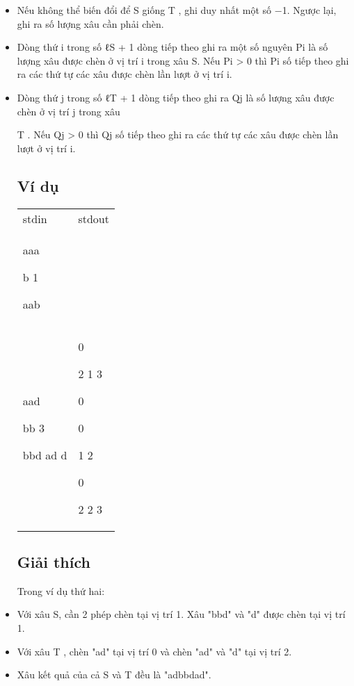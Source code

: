 \begin{itemize}
  \hfill\break
\item
  Nếu không thể biến đổi để {S }giống {T }, ghi duy nhất một số {−}{1}.
  Ngược lại, ghi ra số lượng xâu cần phải chèn.
\item
  {Dòng thứ }i {trong số }ℓ{S} {+ 1 }{dòng tiếp theo ghi ra một số
  nguyên }P{i} {là số lượng xâu được chèn ở vị trí }i {trong xâu }S{.
  Nếu }P{i} > {0 }{thì }P{i} {số tiếp theo ghi ra các thứ
  tự các xâu được chèn lần lượt ở vị trí }i{.}
\item
  {Dòng thứ }j {trong số }ℓ{T} {+ 1 }{dòng tiếp theo ghi ra }Q{j} {là số
  lượng xâu được chèn ở vị trí }j {trong xâu}

  T {. Nếu }Q{j} > {0 }{thì }Q{j} {số tiếp theo ghi ra các
  thứ tự các xâu được chèn lần lượt ở vị trí }i{.}

  \subsection{Ví dụ}\label{vuxed-dux1ee5}

  \hfill\break

  \begin{longtable}[]{@{}
    >{\raggedright\arraybackslash}p{}
    >{\raggedright\arraybackslash}p{}@{}}
  \toprule\noalign{}
  \endhead
  \bottomrule\noalign{}
  \endlastfoot
  stdin & stdout \\
  aaa

  b 1

  aab & -1 \\
  aad

  bb 3

  bbd ad d & 5

  0

  2 1 3

  0

  0

  1 2

  0

  2 2 3 \\
  \end{longtable}

  \subsection{Giải thích}\label{giux1ea3i-thuxedch}

  Trong ví dụ thứ hai:

  \hfill\break
\item
  Với xâu {S}, cần 2 phép chèn tại vị trí 1. Xâu "bbd" và "d" được chèn
  tại vị trí 1.
\item
  Với xâu {T }, chèn "ad" tại vị trí 0 và chèn "ad" và "d" tại vị trí 2.
\item
  Xâu kết quả của cả {S }và {T }đều là "adbbdad".


\end{itemize}
